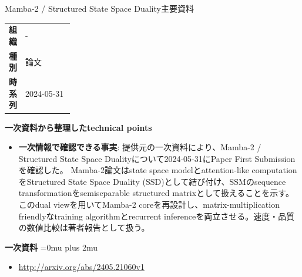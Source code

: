 \begin{technicalnote}{Mamba-2 / Structured State Space Duality}{主要資料}
\begingroup
\begin{tabularx}{\linewidth}{@{}>{\bfseries}p{0.22\linewidth}X@{}}
組織 & - \\
種別 & 論文 \\
時系列 & 2024-05-31 \\
\end{tabularx}
\smallskip
\begin{minipage}{\linewidth}
{\bfseries 一次資料から整理したtechnical points}
\begin{itemize}[leftmargin=1.5em,itemsep=0.35em]
\item \textbf{一次情報で確認できる事実}: 提供元の一次資料により、Mamba-2 / Structured State Space Dualityについて2024-05-31にPaper First Submissionを確認した。 Mamba-2論文はstate space modelとattention-like computationをStructured State Space Duality (SSD)として結び付け、SSMのsequence transformationをsemiseparable structured matrixとして扱えることを示す。このdual viewを用いてMamba-2 coreを再設計し、matrix-multiplication friendlyなtraining algorithmとrecurrent inferenceを両立させる。速度・品質の数値比較は著者報告として扱う。
\end{itemize}
\begin{minipage}{\linewidth}
\begin{samepage}
{\bfseries 一次資料}
\begingroup\sloppy
\Urlmuskip=0mu plus 2mu\relax
\begin{itemize}[leftmargin=1.5em,itemsep=0.25em]
\item {\scriptsize\url{http://arxiv.org/abs/2405.21060v1}}
\end{itemize}
\endgroup
\end{samepage}
\end{minipage}
\end{minipage}
\endgroup
\end{technicalnote}
\medskip

